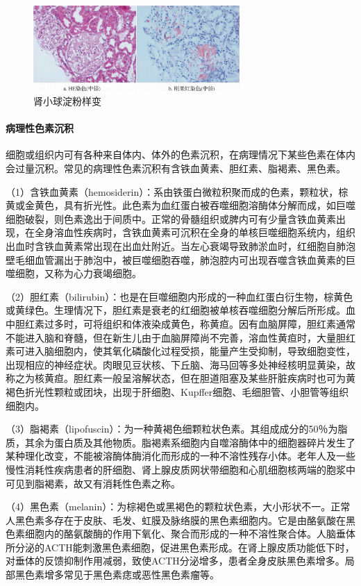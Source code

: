 \begin{figure}[!htbp]
	\centering
	\includegraphics[width=0.7\textwidth]{./images/Image00012.jpg}
	\caption{肾小球淀粉样变}
	\label{fig1-11}
\end{figure}

\paragraph{病理性色素沉积}
细胞或组织内可有各种来自体内、体外的色素沉积，在病理情况下某些色素在体内会过量沉积。常见的病理性色素沉积有含铁血黄素、胆红素、脂褐素、黑色素。

（1）含铁血黄素（hemosiderin）：系由铁蛋白微粒积聚而成的色素，颗粒状，棕黄或金黄色，具有折光性。此色素为血红蛋白被吞噬细胞溶酶体分解而成，如巨噬细胞破裂，则色素逸出于间质中。正常的骨髓组织或脾内可有少量含铁血黄素出现，在全身溶血性疾病时，含铁血黄素可沉积在全身的单核巨噬细胞系统内，组织出血时含铁血黄素常出现在出血灶附近。当左心衰竭导致肺淤血时，红细胞自肺泡壁毛细血管漏出于肺泡中，被巨噬细胞吞噬，肺泡腔内可出现吞噬含铁血黄素的巨噬细胞，又称为心力衰竭细胞。

（2）胆红素（bilirubin）：也是在巨噬细胞内形成的一种血红蛋白衍生物，棕黄色或黄绿色。生理情况下，胆红素是衰老的红细胞被单核吞噬细胞分解后所形成。血中胆红素过多时，可将组织和体液染成黄色，称黄疸。因有血脑屏障，胆红素通常不能进入脑和脊髓，但在新生儿由于血脑屏障尚不完善，溶血性黄疸时，大量胆红素可进入脑细胞内，使其氧化磷酸化过程受损，能量产生受抑制，导致细胞变性，出现相应的神经症状。肉眼见豆状核、下丘脑、海马回等多处神经核明显黄染，故称之为核黄疸。胆红素一般呈溶解状态，但在胆道阻塞及某些肝脏疾病时也可为黄褐色折光性颗粒或团块，出现于肝细胞、Kupffer细胞、毛细胆管、小胆管等组织细胞内。

（3）脂褐素（lipofuscin）：为一种黄褐色细颗粒状色素。其组成成分的50％为脂质，其余为蛋白质及其他物质。脂褐素系细胞内自噬溶酶体中的细胞器碎片发生了某种理化改变，不能被溶酶体酶消化而形成的一种不溶性残存小体。老年人及一些慢性消耗性疾病患者的肝细胞、肾上腺皮质网状带细胞和心肌细胞核两端的胞浆中可见到脂褐素，故又有消耗性色素之称。

（4）黑色素（melanin）：为棕褐色或黑褐色的颗粒状色素，大小形状不一。正常人黑色素多存在于皮肤、毛发、虹膜及脉络膜的黑色素细胞内。它是由酪氨酸在黑色素细胞内的酪氨酸酶的作用下氧化、聚合而形成的一种不溶性聚合体。人脑垂体所分泌的ACTH能刺激黑色素细胞，促进黑色素形成。在肾上腺皮质功能低下时，对垂体的反馈抑制作用减弱，致使ACTH分泌增多，患者全身皮肤黑色素增多。局部黑色素增多常见于黑色素痣或恶性黑色素瘤等。

